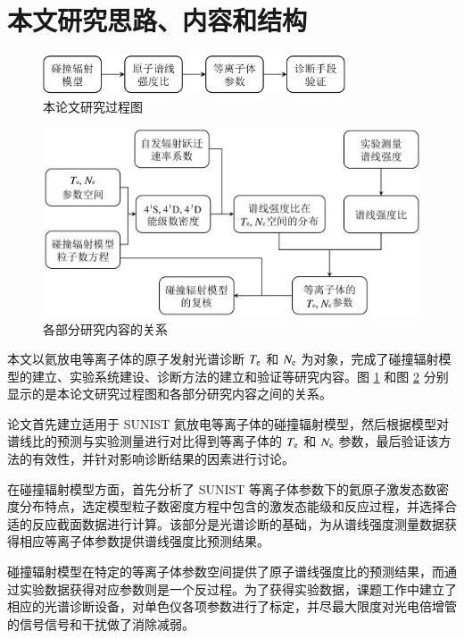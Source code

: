 \section{本文研究思路、内容和结构}

\begin{figure}%
  \centering
  \includegraphics[width=0.8\textwidth]{research-progress.pdf}
  \caption{本论文研究过程图}
  \label{fig:chap01:research-progress}
\end{figure}

\begin{figure}%
  \centering
  \includegraphics[width=\textwidth]{lineratio-method-rellevelabun.pdf}
  \caption{各部分研究内容的关系}
  \label{fig:chap01:research-relationship}
\end{figure}

本文以氦放电等离子体的原子发射光谱诊断 $T_{\rm e}$ 和 $N_{\rm e}$ 为对象，完成了碰撞辐射模型的建立、实验系统建设、诊断方法的建立和验证等研究内容。图 \ref{fig:chap01:research-progress} 和图 \ref{fig:chap01:research-relationship} 分别显示的是本论文研究过程图和各部分研究内容之间的关系。

论文首先建立适用于 SUNIST 氦放电等离子体的碰撞辐射模型，然后根据模型对谱线比的预测与实验测量进行对比得到等离子体的 $T_{\rm e}$ 和 $N_{\rm e}$ 参数，最后验证该方法的有效性，并针对影响诊断结果的因素进行讨论。

在碰撞辐射模型方面，首先分析了 SUNIST 等离子体参数下的氦原子激发态数密度分布特点，选定模型粒子数密度方程中包含的激发态能级和反应过程，并选择合适的反应截面数据进行计算。该部分是光谱诊断的基础，为从谱线强度测量数据获得相应等离子体参数提供谱线强度比预测结果。

碰撞辐射模型在特定的等离子体参数空间提供了原子谱线强度比的预测结果，而通过实验数据获得对应参数则是一个反过程。为了获得实验数据，课题工作中建立了相应的光谱诊断设备，对单色仪各项参数进行了标定，并尽最大限度对光电倍增管的信号信号和干扰做了消除减弱。%

